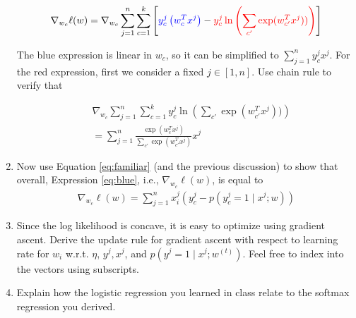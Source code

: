 \begin{enumerate}
\begin{align} \label{eq:blue}
%
\nabla_{w_c}\ell(w)
=
%
\nabla_{w_c} \sum_{j=1}^n \sum_{c=1}^{k} \left[ {\color{blue} y_c^j\left( w_c^Tx^j\right)}
    -{\color{red}y_c^j\ln\left( \sum_{c'}\exp(w_{c'}^T x^j))\right)}\right]
\end{align}

The blue expression is linear in $w_c$, so it can be simplified to $\sum_{j=1}^n y_c^j x^j$.
For the red expression, first we consider a fixed $j\in [1,n]$. Use chain rule to verify that

\begin{align}
&~\nabla_{w_c} \sum_{j=1}^n \sum_{c=1}^{k} y_c^j\ln\left( \sum_{c'}\exp(w_{c'}^T x^j))\right)\\
%
&~=\sum_{j=1}^n \frac{\exp(w_{c}^T x^j)}{\sum_{c'}\exp(w_{c'}^T x^j)}x^j\label{eq:familiar}
%
\end{align}
\begin{tcolorbox}[fit,height=12cm, width=0.9\textwidth, blank,     borderline={1pt}{-2pt},nobeforeafter]
    \end{tcolorbox}

\pagebreak
\item {} %
Now use Equation \ref{eq:familiar} (and the previous discussion) to show that overall,
Expression \ref{eq:blue}, i.e., $\nabla_{w_c}\ell(w)$, is equal to
\begin{align} \label{eq:mcle1}
\nabla_{w_c}\ell(w) =\sum_{j = 1}^{n} x_i^j(y_c^j - p(y_c^j=1 \mid x^j; w)) 
\end{align}
\begin{tcolorbox}[fit,height=7cm, width=0.9\textwidth, blank,     borderline={1pt}{-2pt},nobeforeafter]
    \end{tcolorbox}
    
\item {}
Since the log likelihood is concave, it is easy to optimize using gradient ascent.
Derive the update rule for gradient ascent with respect to learning rate for $w_i$ w.r.t. $\eta$, $y^j, x^j$, and $p(y^j=1\mid x^j;w^{(t)})$. Feel free to index into the vectors using subscripts.

\begin{tcolorbox}[fit,height=10cm, width=0.9\textwidth, blank,     borderline={1pt}{-2pt},nobeforeafter]
    \end{tcolorbox}

\pagebreak
\item {}
Explain how the logistic regression you learned in class relate to the softmax regression you derived.

\begin{tcolorbox}[fit,height=8cm, width=0.9\textwidth, blank,     borderline={1pt}{-2pt},nobeforeafter]
    \end{tcolorbox}
\end{enumerate}




